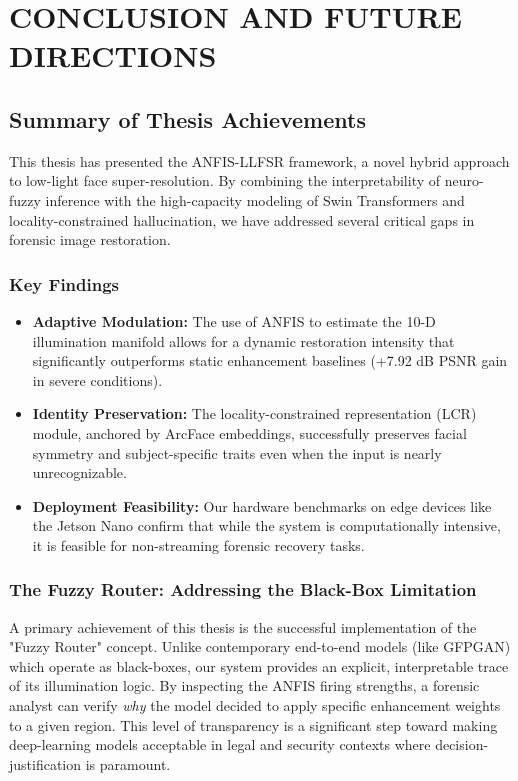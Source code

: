 \chapter{CONCLUSION AND FUTURE DIRECTIONS}

\section{Summary of Thesis Achievements}
This thesis has presented the ANFIS-LLFSR framework, a novel hybrid approach to low-light face super-resolution. By combining the interpretability of neuro-fuzzy inference with the high-capacity modeling of Swin Transformers and locality-constrained hallucination, we have addressed several critical gaps in forensic image restoration.

\subsection{Key Findings}
\begin{itemize}
    \item \textbf{Adaptive Modulation:} The use of ANFIS to estimate the 10-D illumination manifold allows for a dynamic restoration intensity that significantly outperforms static enhancement baselines (+7.92 dB PSNR gain in severe conditions).
    \item \textbf{Identity Preservation:} The locality-constrained representation (LCR) module, anchored by ArcFace embeddings, successfully preserves facial symmetry and subject-specific traits even when the input is nearly unrecognizable.
    \item \textbf{Deployment Feasibility:} Our hardware benchmarks on edge devices like the Jetson Nano confirm that while the system is computationally intensive, it is feasible for non-streaming forensic recovery tasks.
\end{itemize}

\subsection{The Fuzzy Router: Addressing the Black-Box Limitation}
A primary achievement of this thesis is the successful implementation of the "Fuzzy Router" concept. Unlike contemporary end-to-end models (like GFPGAN) which operate as black-boxes, our system provides an explicit, interpretable trace of its illumination logic. By inspecting the ANFIS firing strengths, a forensic analyst can verify \textit{why} the model decided to apply specific enhancement weights to a given region. This level of transparency is a significant step toward making deep-learning models acceptable in legal and security contexts where decision-justification is paramount.
    
